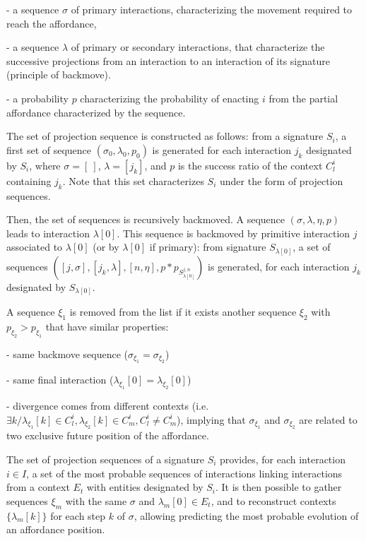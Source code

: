 \documentclass[conference]{IEEEtran}
\begin{document}
- a sequence $\sigma$ of primary interactions, characterizing the movement required to reach the affordance,

- a sequence $\lambda$ of primary or secondary interactions, that characterize the successive projections from an interaction to an interaction of its signature (principle of backmove).

- a probability $p$ characterizing the probability of enacting $i$ from the partial affordance characterized by the sequence.


The set of projection sequence is constructed as follows: from a signature $S_i$, a first set of sequence $(\sigma_0, \lambda_0, p_0)$ is generated for each interaction $j_k$ designated by $S_i$, where $\sigma=[\: ]$, $\lambda=[j_k]$,
and $p$ is the success ratio of the context $C_l^i$ containing $j_k$. Note that this set characterizes $S_i$ under the form of projection sequences.

Then, the set of sequences is recursively backmoved. A sequence $(\sigma, \lambda, \eta, p)$ leads to interaction $\lambda[0]$. This sequence is backmoved by primitive interaction $j$ associated to $\lambda[0]$ (or by $\lambda[0]$ if primary): from signature $S_{\lambda[0]}$, a set of sequences $([j,\sigma], [j_k,\lambda], [n,\eta], p*p_{S_{\lambda[0]}^{j,n}})$ is generated, for each interaction $j_k$ designated by $S_{\lambda[0]}$.

A sequence $\xi_1$ is removed from the list if it exists another sequence $\xi_2$ with $p_{\xi_2}>p_{\xi_1}$ that have similar properties:

- same backmove sequence ($\sigma_{\xi_1}=\sigma_{\xi_2}$)

- same final interaction ($\lambda_{\xi_1}[0]=\lambda_{\xi_2}[0]$)

- divergence comes from different contexts (i.e. $\exists k / \lambda_{\xi_1}[k] \in C_l^i, \lambda_{\xi_2}[k] \in C_m^i, C_l^i \neq C_m^i$), implying that $\sigma_{\xi_1}$ and $\sigma_{\xi_2}$  are related to two exclusive future position of the affordance. %

The set of projection sequences of a signature $S_i$ provides, for each interaction $i \in I$, a set of the most probable sequences of interactions linking interactions from a context $E_t$ with entities designated by $S_i$.
It is then possible to gather sequences $\xi_m$ with the same $\sigma$ and $\lambda_m[0]\in E_t$, and to reconstruct contexts $\{\lambda_m[k]\}$ for each step $k$ of $\sigma$, allowing  predicting the most probable evolution of an affordance position.
\end{document}
